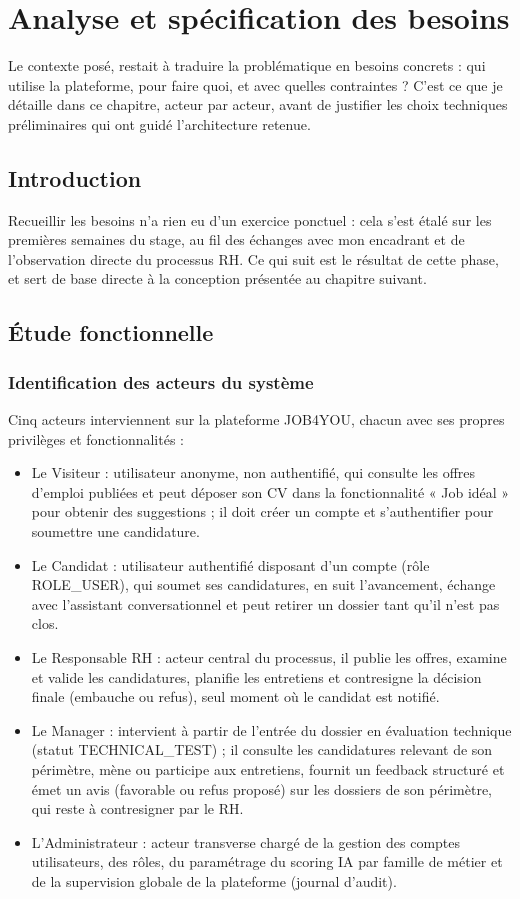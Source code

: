 \chapter{Analyse et spécification des besoins}

Le contexte posé, restait à traduire la problématique en besoins concrets : qui utilise la plateforme, pour faire quoi, et avec quelles contraintes ? C’est ce que je détaille dans ce chapitre, acteur par acteur, avant de justifier les choix techniques préliminaires qui ont guidé l’architecture retenue.

\section{Introduction}
\label{sec_2_1}
Recueillir les besoins n’a rien eu d’un exercice ponctuel : cela s’est étalé sur les premières semaines du stage, au fil des échanges avec mon encadrant et de l’observation directe du processus RH. Ce qui suit est le résultat de cette phase, et sert de base directe à la conception présentée au chapitre suivant.

\section{Étude fonctionnelle}
\label{sec_2_2}
\subsection{Identification des acteurs du système}
\label{sec_2_2_1}
Cinq acteurs interviennent sur la plateforme JOB4YOU, chacun avec ses propres privilèges et fonctionnalités :

\begin{itemize}
\item Le Visiteur : utilisateur anonyme, non authentifié, qui consulte les offres d’emploi publiées et peut déposer son CV dans la fonctionnalité « Job idéal » pour obtenir des suggestions ; il doit créer un compte et s’authentifier pour soumettre une candidature.
\item Le Candidat : utilisateur authentifié disposant d’un compte (rôle ROLE\_USER), qui soumet ses candidatures, en suit l’avancement, échange avec l’assistant conversationnel et peut retirer un dossier tant qu’il n’est pas clos.
\item Le Responsable RH : acteur central du processus, il publie les offres, examine et valide les candidatures, planifie les entretiens et contresigne la décision finale (embauche ou refus), seul moment où le candidat est notifié.
\item Le Manager : intervient à partir de l’entrée du dossier en évaluation technique (statut TECHNICAL\_TEST) ; il consulte les candidatures relevant de son périmètre, mène ou participe aux entretiens, fournit un feedback structuré et émet un avis (favorable ou refus proposé) sur les dossiers de son périmètre, qui reste à contresigner par le RH.
\item L’Administrateur : acteur transverse chargé de la gestion des comptes utilisateurs, des rôles, du paramétrage du scoring IA par famille de métier et de la supervision globale de la plateforme (journal d’audit).
\end{itemize}


